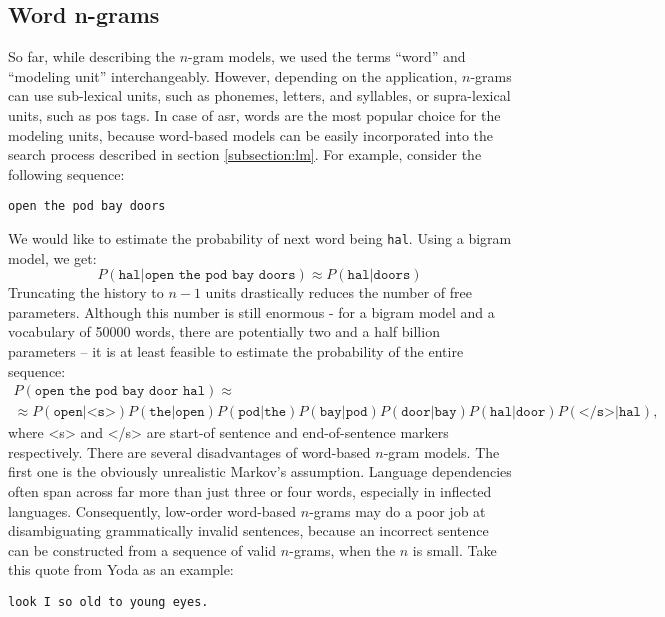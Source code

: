 \subsection{Word n-grams}
So far, while describing the $n$-gram models, we used the terms ``word'' and ``modeling unit'' interchangeably. However, depending on the application, $n$-grams can use sub-lexical units, such as phonemes, letters, and syllables, or supra-lexical units, such as \gls{pos} tags. In case of \gls{asr}, words are the most popular choice for the modeling units, because word-based models can be easily incorporated into the search process described in section \ref{subsection:lm}. For example, consider the following sequence:
\begin{center}
\texttt{open the pod bay doors}  
\end{center}
We would like to estimate the probability of next word being \texttt{hal}. Using a bigram model, we get:
\begin{equation}
	P(\texttt{hal}|\texttt{open the pod bay doors}) \approx P(\texttt{hal}|\texttt{doors})
\end{equation}
Truncating the history to $n-1$ units drastically reduces the number of free parameters. Although this number is still enormous - for a bigram model and a vocabulary of 50000 words, there are potentially two and a half billion parameters -- it is at least feasible to estimate the probability of the entire sequence:
\begin{multline}
	P(\texttt{open the pod bay door hal}) \approx \\
	\approx P(\texttt{open}|\texttt{<s>})P(\texttt{the}|\texttt{open})P(\texttt{pod}|\texttt{the})P(\texttt{bay}|\texttt{pod})P(\texttt{door}|\texttt{bay})P(\texttt{hal}|\texttt{door})P(\texttt{</s>}|\texttt{hal}),
\end{multline}
where <s> and </s> are start-of sentence and end-of-sentence markers respectively.
There are several disadvantages of word-based $n$-gram models. The first one is the obviously unrealistic Markov's assumption. Language dependencies often span across far more than just three or four words, especially in inflected languages. Consequently, low-order word-based $n$-grams may do a poor job at disambiguating grammatically invalid sentences, because an incorrect sentence can be constructed from a sequence of valid $n$-grams, when the $n$ is small. Take this quote from Yoda as an example:
\begin{center}
	\texttt{look I so old to young eyes.}
\end{center}
